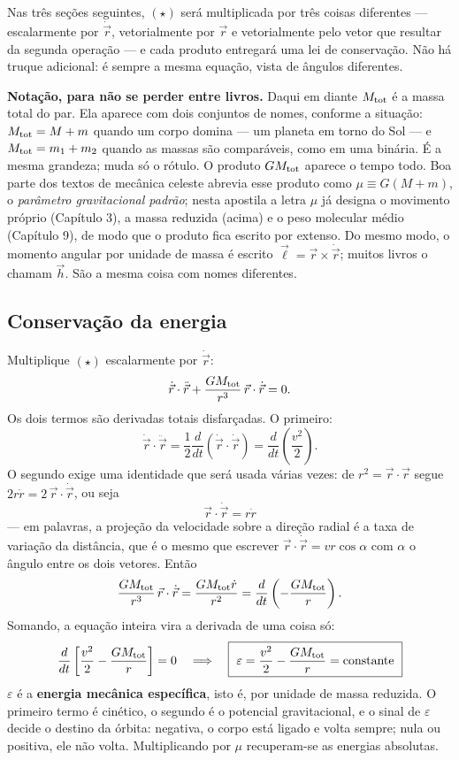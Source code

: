\documentclass[11pt,a4paper]{article}
\begin{document}
Nas três seções seguintes, $(\star)$ será multiplicada por três coisas diferentes --- escalarmente por
$\dot{\vec{r}}$, vetorialmente por $\vec{r}$ e vetorialmente pelo vetor que resultar da segunda operação --- e
cada produto entregará uma lei de conservação. Não há truque adicional: é sempre a mesma equação, vista de
ângulos diferentes.

\begin{noticebox}
\textbf{Notação, para não se perder entre livros.} Daqui em diante $M_{\rm tot}$ é a massa total do par. Ela
aparece com dois conjuntos de nomes, conforme a situação: $M_{\rm tot}=M+m$ quando um corpo domina --- um
planeta em torno do Sol --- e $M_{\rm tot}=m_1+m_2$ quando as massas são comparáveis, como em uma binária. É a
mesma grandeza; muda só o rótulo. O produto $GM_{\rm tot}$ aparece o tempo todo. Boa parte dos textos de mecânica celeste abrevia esse produto
como $\mu\equiv G(M+m)$, o \emph{parâmetro gravitacional padrão}; nesta apostila a letra $\mu$ já designa o
movimento próprio (Capítulo 3), a massa reduzida (acima) e o peso molecular médio (Capítulo 9), de modo que o
produto fica escrito por extenso. Do mesmo modo, o momento angular por unidade de massa é escrito
$\vec{\ell}=\vec{r}\times\dot{\vec{r}}$; muitos livros o chamam $\vec{h}$. São a mesma coisa com nomes
diferentes.
\end{noticebox}

\subsection*{Conservação da energia}

Multiplique $(\star)$ escalarmente por $\dot{\vec{r}}$:
\[
\dot{\vec{r}}\cdot\ddot{\vec{r}}+\frac{GM_{\rm tot}}{r^{3}}\,\vec{r}\cdot\dot{\vec{r}}=0.
\]
Os dois termos são derivadas totais disfarçadas. O primeiro:
\[
\dot{\vec{r}}\cdot\ddot{\vec{r}}=\frac{1}{2}\frac{d}{dt}\left(\dot{\vec{r}}\cdot\dot{\vec{r}}\right)
=\frac{d}{dt}\left(\frac{v^{2}}{2}\right).
\]
O segundo exige uma identidade que será usada várias vezes: de $r^{2}=\vec{r}\cdot\vec{r}$ segue
$2r\dot{r}=2\,\vec{r}\cdot\dot{\vec{r}}$, ou seja
\[
\vec{r}\cdot\dot{\vec{r}}=r\dot{r}
\]
--- em palavras, a projeção da velocidade sobre a direção radial é a taxa de variação da distância, que é o
mesmo que escrever $\vec{r}\cdot\dot{\vec{r}}=vr\cos\alpha$ com $\alpha$ o ângulo entre os dois vetores.
Então
\[
\frac{GM_{\rm tot}}{r^{3}}\,\vec{r}\cdot\dot{\vec{r}}=\frac{GM_{\rm tot}\dot{r}}{r^{2}}
=\frac{d}{dt}\left(-\frac{GM_{\rm tot}}{r}\right).
\]
Somando, a equação inteira vira a derivada de uma coisa só:
\[
\frac{d}{dt}\left[\frac{v^{2}}{2}-\frac{GM_{\rm tot}}{r}\right]=0
\quad\Longrightarrow\quad
\boxed{\ \varepsilon=\frac{v^{2}}{2}-\frac{GM_{\rm tot}}{r}=\text{constante}\ }
\]
$\varepsilon$ é a \textbf{energia mecânica específica}, isto é, por unidade de massa reduzida. O primeiro termo
é cinético, o segundo é o potencial gravitacional, e o sinal de $\varepsilon$ decide o destino da órbita:
negativa, o corpo está ligado e volta sempre; nula ou positiva, ele não volta. Multiplicando por $\mu$
recuperam-se as energias absolutas.
\end{document}
